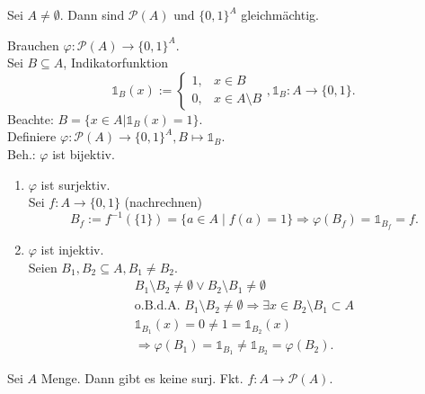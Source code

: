 \documentclass[../ana1.tex]{subfiles}
\begin{document}
\begin{lem}
	Sei \(A\neq\emptyset{}\). Dann sind \( \mathcal{P}(A) \) und \( {\{0,1\}}^A \) gleichmächtig.
\end{lem}
\begin{bew}
	Brauchen \(\varphi : \mathcal{P}(A) \rightarrow {\{0,1\}}^A \).\\
	Sei \(B \subseteq A \), Indikatorfunktion \[ \mathds{1}_B(x) := \begin{cases}
			1, & x\in B            \\
			0, & x\in A\setminus B
		\end{cases}
		, \mathds{1}_B : A \rightarrow \{0,1\}. \]
	Beachte: \(B = \{x\in A | \mathds{1}_B(x) = 1 \} \).\\
	Definiere \( \varphi : \mathcal{P}(A) \rightarrow {\{0,1\}}^A, B \mapsto \mathds{1}_B \).\\
	Beh.: \(\varphi \) ist bijektiv.
	\begin{enumerate}
		\item \( \varphi \) ist surjektiv.\\
		      Sei \(f: A\rightarrow \{0,1\} \) (nachrechnen)
			  \[ B_f := f^{-1} (\{1\}) = \{a \in A \; \vert \; f(a) = 1 \} \Rightarrow \varphi(B_f) = \mathds{1}_{B_f} = f.\]
		\item \( \varphi \) ist injektiv.\\
		      Seien \( B_1,B_2\subseteq A, B_1 \neq B_2 \).
		      \begin{align*}
			      B_1\setminus B_2 \neq \emptyset \vee B_2\setminus B_1 \neq \emptyset                                    \\
			      \text{o.B.d.A. } B_1 \setminus B_2 \neq \emptyset \Rightarrow \exists x \in B_2 \setminus B_1 \subset A \\
			      \mathds{1}_{B_1}(x) = 0 \neq 1 = \mathds{1}_{B_2}(x)                                                    \\
			      \Rightarrow \varphi(B_1) = \mathds{1}_{B_1} \neq \mathds{1}_{B_2} = \varphi(B_2).
		      \end{align*}
	\end{enumerate}
\end{bew}

\begin{lem}
	Sei \(A\) Menge. Dann gibt es keine surj. Fkt. \(f: A\rightarrow \mathcal{P}(A) \).
\end{lem}
\end{document}
